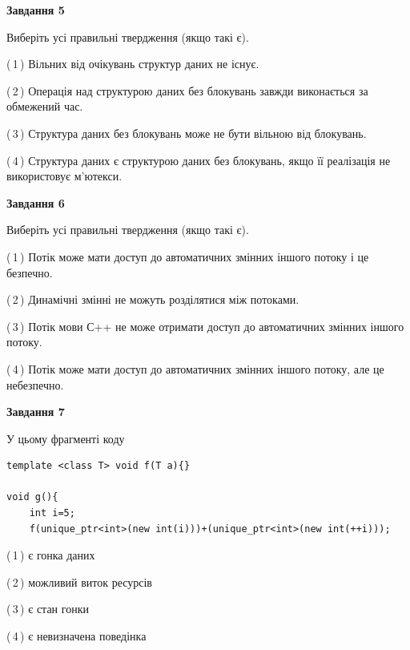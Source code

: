 \documentclass[12pt, ukrainian]{article}
\begin{document}
\begin {large}
{\begin{center}
\textbf{Завдання 5}
\end{center}

Виберіть усі правильні твердження (якщо такі є).\par
\vspace{2mm}

(\,1\,) Вільних від очікувань структур даних не існує.%

(\,2\,) Операція над структурою даних без блокувань завжди виконається за обмежений час.%

(\,3\,) Структура даних без блокувань може не бути вільною від блокувань.%

(\,4\,) Структура даних є структурою даних без блокувань, якщо її реалізація не використовує м’ютекси.%
\newpage


\begin{center}
\textbf{Завдання 6}
\end{center}

Виберіть усі правильні твердження (якщо такі є).\par
\vspace{2mm}

(\,1\,) Потік може мати доступ до автоматичних змінних іншого потоку і це безпечно.%

(\,2\,) Динамічні змінні не можуть розділятися між потоками.%

(\,3\,) Потік мови С++ не може отримати доступ до автоматичних змінних іншого потоку.%

(\,4\,) Потік може мати доступ до автоматичних змінних іншого потоку, але це небезпечно.%


\begin{center}
\textbf{Завдання 7}
\end{center}

У цьому фрагменті коду
\begin{verbatim}
template <class T> void f(T a){}

void g(){
    int i=5;
    f(unique_ptr<int>(new int(i)))+(unique_ptr<int>(new int(++i)));
\end{verbatim}
(\,1\,) є гонка даних%

(\,2\,) можливий виток ресурсів%

(\,3\,) є стан гонки%

(\,4\,) є невизначена поведінка%

}
\end {large}

\vspace{4mm}
\newpage
\end{document}
